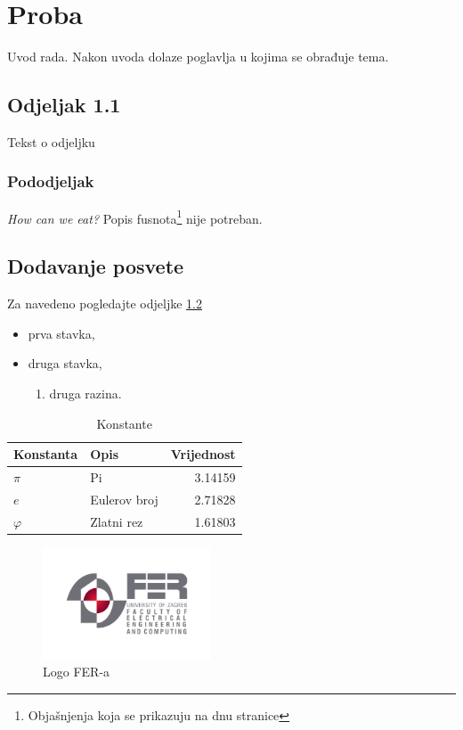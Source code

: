 \documentclass[times, utf8, diplomski]{fer}
\begin{document}
\chapter{Proba}
Uvod rada. Nakon uvoda dolaze poglavlja u kojima se obrađuje tema.
\section{Odjeljak 1.1}
Tekst o odjeljku
\subsection{Pododjeljak}
\emph{How can we eat?}
Popis fusnota\footnote{Objašnjenja koja se prikazuju
na dnu stranice} nije potreban.
\section{Dodavanje posvete}
\label{sec:posveta}
Za navedeno pogledajte odjeljke \ref{sec:posveta}
\begin{itemize}
	\item prva stavka,
	\item druga stavka,
	\begin{enumerate}
		\item druga razina.
	\end{enumerate}
\end{itemize}

\begin{table}[htb]
\caption{Konstante}
\label{tbl:konstante}
\centering
\begin{tabular}{llr} \toprule
Konstanta & Opis & Vrijednost\\ \midrule
$\pi$ & Pi & 3.14159 \\
$e$ & Eulerov broj & 2.71828 \\
$\varphi$ & Zlatni rez & 1.61803 \\ \bottomrule
\end{tabular}
\end{table}

\begin{figure}[htb]
\centering
\includegraphics[width=5cm]{img/fer_logo.jpg}
\caption{Logo FER-a}
\label{fig:fer-logo}
\end{figure}
\end{document}
